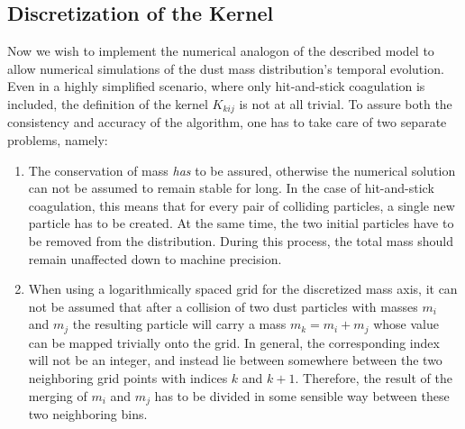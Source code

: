     \subsection{Discretization of the Kernel}

        Now we wish to implement the numerical analogon of the described model to allow 
        numerical simulations of the dust mass distribution's temporal evolution. \\

        Even in a highly simplified scenario, where only hit-and-stick coagulation is included, the 
        definition of the kernel $K_{kij}$ is not at all trivial. To assure both the consistency and 
        accuracy of the algorithm, one has to take care of two separate problems, namely:
        \begin{enumerate}
            \item The conservation of mass \textit{has} to be assured, otherwise the numerical solution can 
                not be assumed to remain stable for long. In the case of hit-and-stick coagulation, this 
                means that for every pair of colliding particles, a single new particle has to be created. 
                At the same time, the two initial particles have to be removed from the distribution. 
                During this process, the total mass should remain unaffected down to machine precision.
            \item When using a logarithmically spaced grid for the discretized mass axis, it can not be 
                assumed that after a collision of two dust particles with masses $m_i$ and $m_j$ the 
                resulting particle will carry a mass $m_k=m_i+m_j$ whose value can be mapped trivially onto 
                the grid. In general, the corresponding index will not be an integer, and instead lie 
                between somewhere between the two neighboring grid points with indices $k$ and $k+1$.
                Therefore, the result of the merging of $m_i$ and $m_j$ has to be divided in some sensible 
                way between these two neighboring bins.
        \end{enumerate}

         \\



